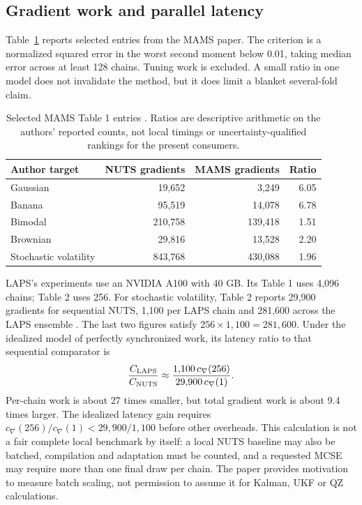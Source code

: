 \subsection{Gradient work and parallel latency}

Table~\ref{tab:bf-modern-mams-benchmarks} reports selected entries from the
MAMS paper. The criterion is a normalized squared error in the worst second
moment below 0.01, taking median error across at least 128 chains. Tuning work
is excluded. A small ratio in one model does not invalidate the method, but
it does limit a blanket several-fold claim.
\begin{table}[htbp]
\centering\small
\begin{tabular}{lrrr}
\toprule
Author target & NUTS gradients & MAMS gradients & Ratio\\
\midrule
Gaussian & 19,652 & 3,249 & 6.05\\
Banana & 95,519 & 14,078 & 6.78\\
Bimodal & 210,758 & 139,418 & 1.51\\
Brownian & 29,816 & 13,528 & 2.20\\
Stochastic volatility & 843,768 & 430,088 & 1.96\\
\bottomrule
\end{tabular}
\caption{Selected MAMS Table 1 entries \citep{robnik2025mams}. Ratios are
descriptive arithmetic on the authors' reported counts, not local timings
or uncertainty-qualified rankings for the present consumers.}
\label{tab:bf-modern-mams-benchmarks}
\end{table}

LAPS's experiments use an NVIDIA A100 with 40 GB. Its Table 1 uses 4,096
chains; Table 2 uses 256. For stochastic volatility, Table 2 reports 29,900
gradients for sequential NUTS, 1,100 per LAPS chain and 281,600 across the
LAPS ensemble \citep{robnik2026laps}. The last two figures satisfy
$256\times1{,}100=281{,}600$. Under the idealized model of perfectly
synchronized work, its latency ratio to that sequential comparator is
\begin{equation}
 \frac{C_{\rm LAPS}}{C_{\rm NUTS}}
 \approx\frac{1{,}100\,c_{\nabla}(256)}
              {29{,}900\,c_{\nabla}(1)}.
 \label{eq:bf-modern-laps-work-latency}
\end{equation}
Per-chain work is about 27 times smaller, but total gradient work is about
9.4 times larger. The idealized latency gain requires
$c_{\nabla}(256)/c_{\nabla}(1)<29{,}900/1{,}100$ before other overheads.
This calculation is not a fair complete local benchmark by itself: a local
NUTS baseline may also be batched, compilation and adaptation must be counted,
and a requested MCSE may require more than one final draw per chain.
The paper provides motivation to measure batch scaling, not permission to
assume it for Kalman, UKF or QZ calculations.

